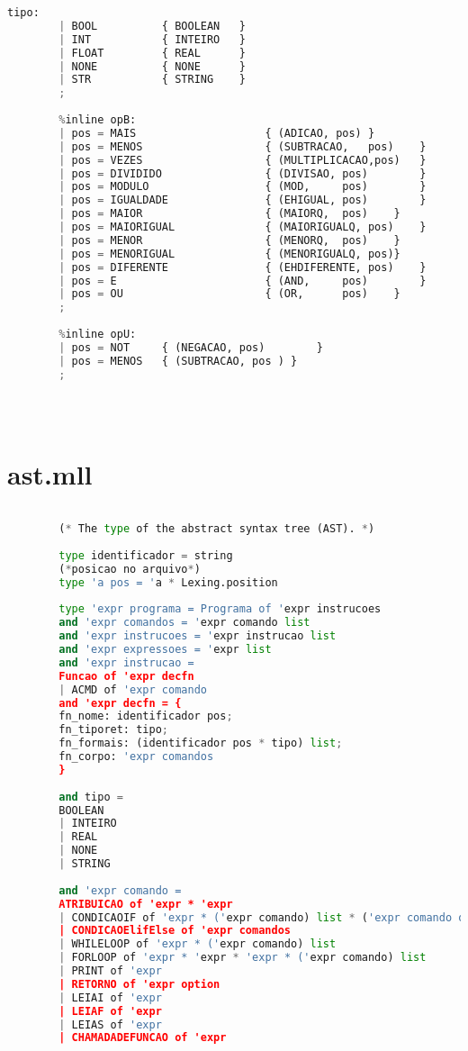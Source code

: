\documentclass[hidelinks,12pt]{article}
\begin{document}
\begin{appendices}
\begin{lstlisting}[caption=sintatico.mly, language=python]
		tipo:
		| BOOL 			{ BOOLEAN 	}
		| INT 			{ INTEIRO 	}
		| FLOAT 		{ REAL 		}
		| NONE 			{ NONE 		}
		| STR           { STRING 	}
		;
		
		%inline opB:
		| pos = MAIS  					{ (ADICAO, pos)	}
		| pos = MENOS  					{ (SUBTRACAO,	pos)	}
		| pos = VEZES  					{ (MULTIPLICACAO,pos)	}
		| pos = DIVIDIDO  				{ (DIVISAO, pos)		}
		| pos = MODULO					{ (MOD, 	pos)		}
		| pos = IGUALDADE  				{ (EHIGUAL, pos)		}
		| pos = MAIOR  					{ (MAIORQ, 	pos)	}
		| pos = MAIORIGUAL				{ (MAIORIGUALQ, pos)	}
		| pos = MENOR 					{ (MENORQ, 	pos)	}
		| pos = MENORIGUAL 				{ (MENORIGUALQ,	pos)}
		| pos = DIFERENTE 				{ (EHDIFERENTE, pos)	}	 
		| pos = E 						{ (AND, 	pos)		}
		| pos = OU						{ (OR, 		pos)	}	
		;
		
		%inline opU:
		| pos = NOT 	{ (NEGACAO, pos) 		}
		| pos = MENOS 	{ (SUBTRACAO, pos ) }
		;
		
		
	
	\end{lstlisting}
	
	\newpage
	\chapter{ast.mll}
	
	\begin{lstlisting}[caption=ast.mll, language=python]
	
		(* The type of the abstract syntax tree (AST). *)
		
		type identificador = string 
		(*posicao no arquivo*)
		type 'a pos = 'a * Lexing.position
		
		type 'expr programa = Programa of 'expr instrucoes
		and 'expr comandos = 'expr comando list
		and 'expr instrucoes = 'expr instrucao list
		and 'expr expressoes = 'expr list
		and 'expr instrucao = 
		Funcao of 'expr decfn 
		| ACMD of 'expr comando 
		and 'expr decfn = {
		fn_nome: identificador pos;
		fn_tiporet: tipo;
		fn_formais: (identificador pos * tipo) list;
		fn_corpo: 'expr comandos
		}	  
		
		and tipo = 
		BOOLEAN
		| INTEIRO
		| REAL
		| NONE
		| STRING
		
		and 'expr comando = 
		ATRIBUICAO of 'expr * 'expr
		| CONDICAOIF of 'expr * ('expr comando) list * ('expr comando option)
		| CONDICAOElifElse of 'expr comandos
		| WHILELOOP of 'expr * ('expr comando) list
		| FORLOOP of 'expr * 'expr * 'expr * ('expr comando) list 
		| PRINT of 'expr 
		| RETORNO of 'expr option
		| LEIAI of 'expr
		| LEIAF of 'expr
		| LEIAS of 'expr
		| CHAMADADEFUNCAO of 'expr
		

\end{lstlisting}
\end{appendices}
\end{document}
